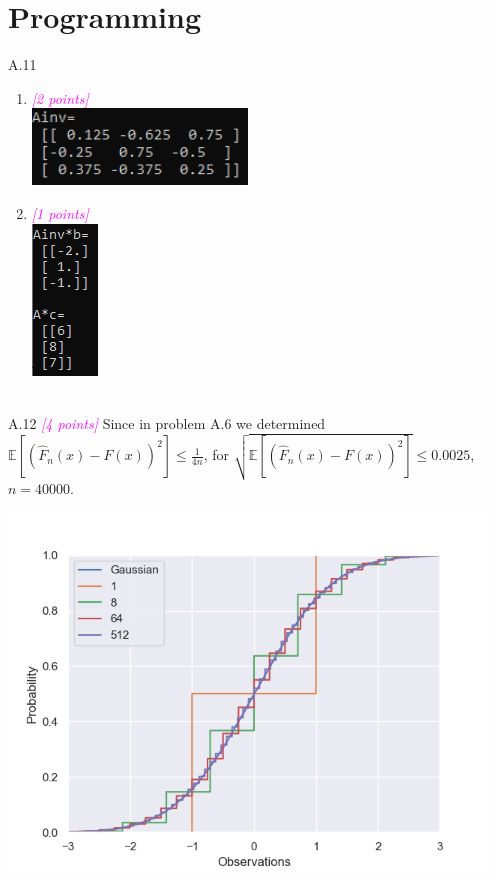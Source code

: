 \documentclass{article}
\newcommand{\1}{\mathbf{1}}
\newcommand{\E}{\mathbb{E}}
\newcommand{\points}[1]{\small\textcolor{magenta}{\emph{[#1 points]}} \normalsize}
\begin{document}
\section*{Programming}

A.11 
  \begin{enumerate}
  \item \points{2} \\ \includegraphics[width=2.25in]{A11a.png}
  \item \points{1} \\ \includegraphics[width=.75in]{A11b.png}
  \end{enumerate}  

\hfill \\
A.12 \points{4} Since in problem A.6 we determined $\displaystyle \E[ ( \widehat{F}_n(x) - F(x) )^2 ] \leq \tfrac{1}{4n}$, for  $\displaystyle \sqrt{\E[ ( \widehat{F}_n(x) - F(x) )^2 ]} \leq 0.0025$, $n=40000$.
\begin{center}
	\includegraphics[width=5in]{A12.png}
\end{center} 
\end{document}
